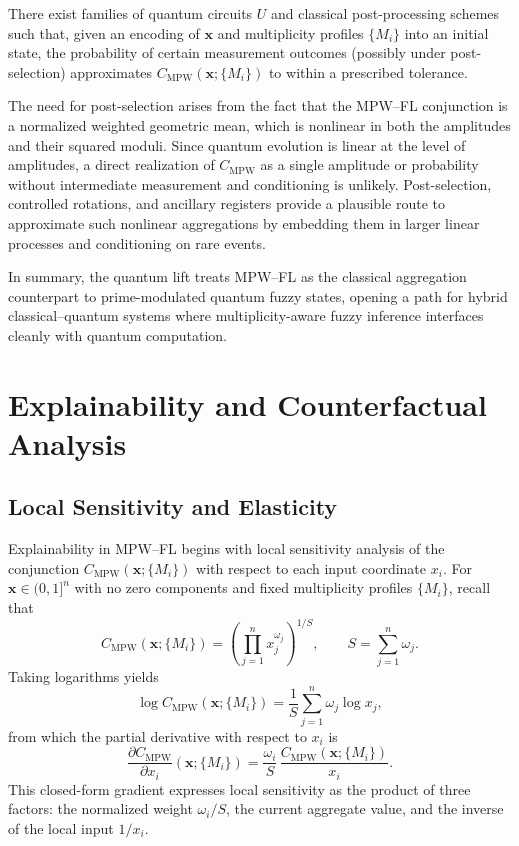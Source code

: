 \documentclass[11pt]{article}
\begin{document}
\begin{conjecture}
\label{conj:quantum-mpw}
There exist families of quantum circuits $U$ and classical post-processing schemes such that, given an encoding of $\mathbf{x}$ and multiplicity profiles $\{M_i\}$ into an initial state, the probability of certain measurement outcomes (possibly under post-selection) approximates $C_{\mathrm{MPW}}(\mathbf{x};\{M_i\})$ to within a prescribed tolerance.
\end{conjecture}

The need for post-selection arises from the fact that the MPW--FL conjunction is a normalized weighted geometric mean, which is nonlinear in both the amplitudes and their squared moduli. Since quantum evolution is linear at the level of amplitudes, a direct realization of $C_{\mathrm{MPW}}$ as a single amplitude or probability without intermediate measurement and conditioning is unlikely. Post-selection, controlled rotations, and ancillary registers provide a plausible route to approximate such nonlinear aggregations by embedding them in larger linear processes and conditioning on rare events.

In summary, the quantum lift treats MPW--FL as the classical aggregation counterpart to prime-modulated quantum fuzzy states, opening a path for hybrid classical--quantum systems where multiplicity-aware fuzzy inference interfaces cleanly with quantum computation.

\section{Explainability and Counterfactual Analysis}
\label{sec:explainability}

\subsection{Local Sensitivity and Elasticity}
\label{subsec:local-sensitivity}

Explainability in MPW--FL begins with local sensitivity analysis of the conjunction $C_{\mathrm{MPW}}(\mathbf{x};\{M_i\})$ with respect to each input coordinate $x_i$. For $\mathbf{x} \in (0,1]^n$ with no zero components and fixed multiplicity profiles $\{M_i\}$, recall that
\[
  C_{\mathrm{MPW}}(\mathbf{x};\{M_i\})
  = \left(\prod_{j=1}^n x_j^{\omega_j}\right)^{1/S}, \qquad S = \sum_{j=1}^n \omega_j.
\]
Taking logarithms yields
\[
  \log C_{\mathrm{MPW}}(\mathbf{x};\{M_i\})
  = \frac{1}{S}\sum_{j=1}^n \omega_j \log x_j,
\]
from which the partial derivative with respect to $x_i$ is
\begin{equation}
  \frac{\partial C_{\mathrm{MPW}}}{\partial x_i}(\mathbf{x};\{M_i\})
  = \frac{\omega_i}{S}\,\frac{C_{\mathrm{MPW}}(\mathbf{x};\{M_i\})}{x_i}.
  \label{eq:local-gradient}
\end{equation}
This closed-form gradient expresses local sensitivity as the product of three factors: the normalized weight $\omega_i/S$, the current aggregate value, and the inverse of the local input $1/x_i$.
\end{document}
